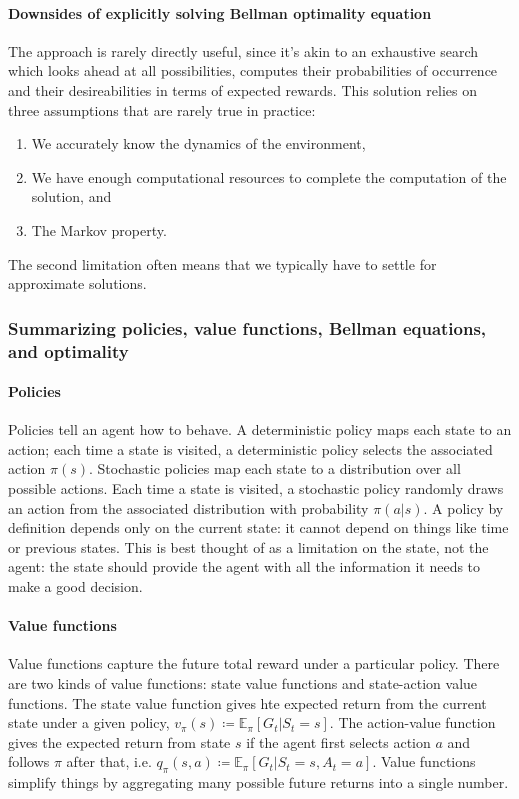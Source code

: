 \documentclass[12pt]{article}
\begin{document}
\paragraph{Downsides of explicitly solving Bellman optimality equation} The approach is rarely directly useful, since it's akin to an exhaustive search which looks ahead at all possibilities, computes their probabilities of occurrence and their desireabilities in terms of expected rewards. This solution relies on three assumptions that are rarely true in practice:
\begin{enumerate}
\item We accurately know the dynamics of the environment,
\item We have enough computational resources to complete the computation of the   solution, and
\item The Markov property.
\end{enumerate}
The second limitation often means that we typically have to settle for approximate solutions.

\subsubsection{Summarizing policies, value functions, Bellman equations, and   optimality}
\paragraph{Policies}
Policies tell an agent how to behave. A deterministic policy maps each state to an action; each time a state is visited, a deterministic policy selects the associated action $\pi(s)$. Stochastic policies map each state to a distribution over all possible actions. Each time a state is visited, a stochastic policy randomly draws an action from the associated distribution with probability $\pi(a|s)$. A policy by definition depends only on the current state: it cannot depend on things like time or previous states. This is best thought of as a limitation on the state, not the agent: the state should provide the agent with all the information it needs to make a good decision.

\paragraph{Value functions} Value functions capture the future total reward under a particular policy. There are two kinds of value functions: state value functions and state-action value functions. The state value function gives hte expected return from the current state under a given policy, $v_\pi(s) \coloneqq \mathbb E_\pi \left[ G_t | S_t = s \right]$. The action-value function gives the expected return from state $s$ if the agent first selects action $a$ and follows $\pi$ after that, i.e. $q_\pi(s,a) \coloneqq \mathbb E_\pi \left[ G_t | S_t = s, A_t = a \right]$. Value functions simplify things by aggregating many possible future returns into a single number.
\end{document}
